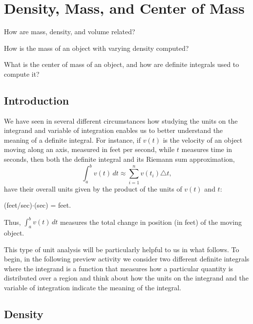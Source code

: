 \section{Density, Mass, and Center of Mass} \label{S:6.4.Mass}

\begin{goals}
\item How are mass, density, and volume related?  
\item How is the mass of an object with varying density computed?
\item What is the center of mass of an object, and how are definite integrals used to compute it?
\end{goals}

\subsection*{Introduction}

We have seen in several different circumstances how studying the units on the integrand and variable of integration enables us to better understand the meaning of a definite integral.  For instance, if $v(t)$ is the velocity of an object moving along an axis, measured in feet per second, while $t$ measures time in seconds, then both the definite integral and its Riemann sum approximation,
$$\int_a^b v(t) \, dt \approx \sum_{i=1}^n v(t_i) \triangle t,$$
have their overall units given by the product of the units of $v(t)$ and $t$: 
\begin{center}(feet/sec)$\cdot$(sec) = feet.
\end{center}
Thus, $\int_a^b v(t) \, dt$ measures the total change in position (in feet) of the moving object.  

This type of unit analysis will be particularly helpful to us in what follows.  To begin, in the following preview activity we consider two different definite integrals where the integrand is a function that measures how a particular quantity is distributed over a region and think about how the units on the integrand and the variable of integration indicate the meaning of the integral.


\subsection*{Density} 

